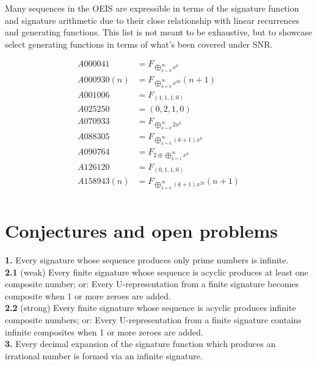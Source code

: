 \documentclass{article}
\begin{document}
Many sequences in the OEIS are expressible in terms of the signature function and signature arithmetic due to their close relationship with linear recurrences and generating functions. This list is not meant to be exhaustive, but to showcase select generating functions in terms of what's been covered under SNR.

\begin{align*}
A000041 &= F_{\displaystyle \bigoplus_{k=0}^{\infty} x^k}\\
A000930(n) &= F_{\displaystyle \bigoplus_{k=0}^{\infty} x^{3k}}(n+1)\\
A001006 &= F_{(1, 1, 1, 0)}\\
A025250 &= (0, 2, 1, 0)\\
A070933 &= F_{\displaystyle \bigoplus_{k=0}^{\infty} 2x^k}\\
A088305 &= F_{\displaystyle \bigoplus_{k=0}^{\infty} (k+1)x^k}\\
A090764 &= F_{2 \oplus \displaystyle \bigoplus_{k=1}^{\infty} x^k}\\
A126120 &= F_{(0, 1, 1, 0)}\\
A158943(n) &= F_{\displaystyle \bigoplus_{k=0}^{\infty} (k+1)x^{2k}}(n+1)\\
\end{align*}

\pagebreak

\section{Conjectures and open problems}

\textbf{1.} Every signature whose sequence produces only prime numbers is infinite.\\

\noindent \textbf{2.1} (weak) Every finite signature whose sequence is acyclic produces at least one composite number; or: Every U-representation from a finite signature becomes composite when 1 or more zeroes are added.\\

\noindent \textbf{2.2} (strong) Every finite signature whose sequence is acyclic produces infinite composite numbers; or: Every U-representation from a finite signature contains infinite composites when 1 or more zeroes are added.\\

\noindent \textbf{3.} Every decimal expansion of the signature function which produces an irrational number is formed via an infinite signature.
\end{document}
